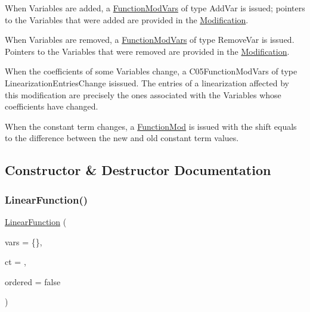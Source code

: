 \begin{DoxyItemize}
\item When Variables are added, a \mbox{\hyperlink{class_s_m_spp__di__unipi__it_1_1_function_mod_vars}{Function\+Mod\+Vars}} of type Add\+Var is issued; pointers to the Variables that were added are provided in the \mbox{\hyperlink{class_s_m_spp__di__unipi__it_1_1_modification}{Modification}}.
\item When Variables are removed, a \mbox{\hyperlink{class_s_m_spp__di__unipi__it_1_1_function_mod_vars}{Function\+Mod\+Vars}} of type Remove\+Var is issued. Pointers to the Variables that were removed are provided in the \mbox{\hyperlink{class_s_m_spp__di__unipi__it_1_1_modification}{Modification}}.
\item When the coefficients of some Variables change, a C05\+Function\+Mod\+Vars of type Linearization\+Entries\+Change isissued. The entries of a linearization affected by this modification are precisely the ones associated with the Variables whose coefficients have changed.
\item When the constant term changes, a \mbox{\hyperlink{class_s_m_spp__di__unipi__it_1_1_function_mod}{Function\+Mod}} is issued with the shift equals to the difference between the new and old constant term values. 
\end{DoxyItemize}

\subsection{Constructor \& Destructor Documentation}
\mbox{\label{class_s_m_spp__di__unipi__it_1_1_linear_function_a835aa4d40952b780da6525aa9c38f226}} 
\subsubsection{\texorpdfstring{Linear\+Function()}{LinearFunction()}}
{\footnotesize\ttfamily \mbox{\hyperlink{class_s_m_spp__di__unipi__it_1_1_linear_function}{Linear\+Function}} (\begin{DoxyParamCaption}\item[{\mbox{\hyperlink{class_s_m_spp__di__unipi__it_1_1_linear_function_aee8988faa66c7c9013613e2c76580ddf}{v\+\_\+coeff\+\_\+pair}} \&\&}]{vars = {\ttfamily \{\}},  }\item[{const \mbox{\hyperlink{class_s_m_spp__di__unipi__it_1_1_function_a9ad432406b609e28d340f73e9474bffe}{Function\+Value}}}]{ct = {},  }\item[{const bool}]{ordered = {\ttfamily false} }\end{DoxyParamCaption})\hspace{0.3cm}{\ttfamily [inline]}}



